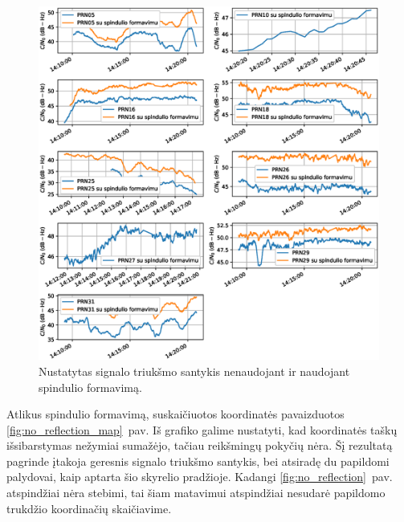 \documentclass[main.tex]{subfiles}
\begin{document}
\begin{figure}[ht]
    \begin{centering}
    \includegraphics[scale=0.6]{drawings/no_refelection_snr}
    \par\end{centering}
    \protect\caption{\label{fig:no_reflection_snr}Nustatytas signalo triukšmo santykis nenaudojant ir naudojant spindulio formavimą.}
\end{figure}

Atlikus spindulio formavimą, suskaičiuotos koordinatės pavaizduotos \ref{fig:no_reflection_map}~pav.
Iš grafiko galime nustatyti, kad koordinatės taškų išsibarstymas nežymiai sumažėjo, tačiau reikšmingų
pokyčių nėra. Šį rezultatą pagrinde įtakoja geresnis signalo triukšmo santykis, bei atsiradę du papildomi
palydovai, kaip aptarta šio skyrelio pradžioje. Kadangi \ref{fig:no_reflection}~pav. atspindžiai
nėra stebimi, tai šiam matavimui atspindžiai nesudarė papildomo trukdžio koordinačių skaičiavime.
\end{document}
